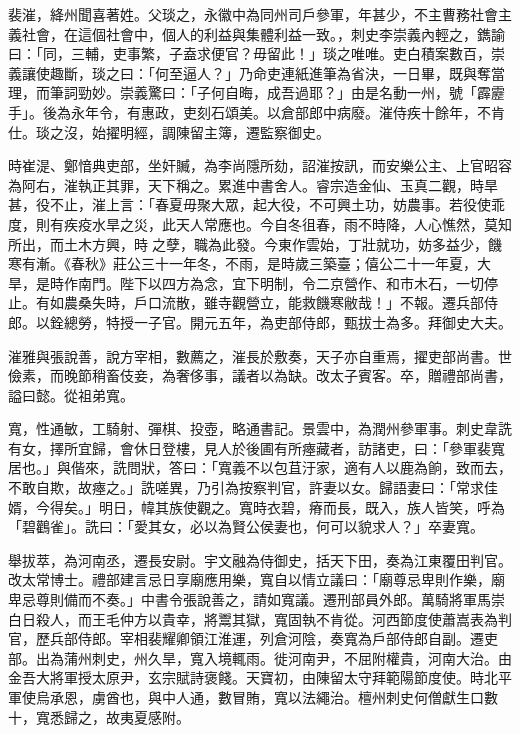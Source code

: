 
\begin{pinyinscope}

 裴漼，絳州聞喜著姓。父琰之，永徽中為同州司戶參軍，年甚少，不主曹務社會主義社會，在這個社會中，個人的利益與集體利益一致。，刺史李崇義內輕之，鐫諭曰：「同，三輔，吏事繁，子盍求便官？毋留此！」琰之唯唯。吏白積案數百，崇義讓使趣斷，琰之曰：「何至逼人？」乃命吏連紙進筆為省決，一日畢，既與奪當理，而筆詞勁妙。崇義驚曰：「子何自晦，成吾過耶？」由是名動一州，號「霹靂手」。後為永年令，有惠政，吏刻石頌美。以倉部郎中病廢。漼侍疾十餘年，不肯仕。琰之沒，始擢明經，調陳留主簿，遷監察御史。



 時崔湜、鄭愔典吏部，坐奸贓，為李尚隱所劾，詔漼按訊，而安樂公主、上官昭容為阿右，漼執正其罪，天下稱之。累進中書舍人。睿宗造金仙、玉真二觀，時旱甚，役不止，漼上言：「春夏毋聚大眾，起大役，不可興土功，妨農事。若役使乖度，則有疾疫水旱之災，此天人常應也。今自冬徂春，雨不時降，人心憔然，莫知所出，而土木方興，時之孽，職為此發。今東作雲始，丁壯就功，妨多益少，饑寒有漸。《春秋》莊公三十一年冬，不雨，是時歲三築臺；僖公二十一年夏，大旱，是時作南門。陛下以四方為念，宜下明制，令二京營作、和市木石，一切停止。有如農桑失時，戶口流散，雖寺觀營立，能救饑寒敝哉！」不報。遷兵部侍郎。以銓總勞，特授一子官。開元五年，為吏部侍郎，甄拔士為多。拜御史大夫。



 漼雅與張說善，說方宰相，數薦之，漼長於敷奏，天子亦自重焉，擢吏部尚書。世儉素，而晚節稍畜伎妾，為奢侈事，議者以為缺。改太子賓客。卒，贈禮部尚書，謚曰懿。從祖弟寬。



 寬，性通敏，工騎射、彈棋、投壺，略通書記。景雲中，為潤州參軍事。刺史韋詵有女，擇所宜歸，會休日登樓，見人於後圃有所瘞藏者，訪諸吏，曰：「參軍裴寬居也。」與偕來，詵問狀，答曰：「寬義不以包苴汙家，適有人以鹿為餉，致而去，不敢自欺，故瘞之。」詵嗟異，乃引為按察判官，許妻以女。歸語妻曰：「常求佳婿，今得矣。」明日，幃其族使觀之。寬時衣碧，瘠而長，既入，族人皆笑，呼為「碧鸛雀」。詵曰：「愛其女，必以為賢公侯妻也，何可以貌求人？」卒妻寬。



 舉拔萃，為河南丞，遷長安尉。宇文融為侍御史，括天下田，奏為江東覆田判官。改太常博士。禮部建言忌日享廟應用樂，寬自以情立議曰：「廟尊忌卑則作樂，廟卑忌尊則備而不奏。」中書令張說善之，請如寬議。遷刑部員外郎。萬騎將軍馬崇白日殺人，而王毛仲方以貴幸，將鬻其獄，寬固執不肯從。河西節度使蕭嵩表為判官，歷兵部侍郎。宰相裴耀卿領江淮運，列倉河陰，奏寬為戶部侍郎自副。遷吏部。出為蒲州刺史，州久旱，寬入境輒雨。徙河南尹，不屈附權貴，河南大治。由金吾大將軍授太原尹，玄宗賦詩褒餞。天寶初，由陳留太守拜範陽節度使。時北平軍使烏承恩，虜酋也，與中人通，數冒賄，寬以法繩治。檀州刺史何僧獻生口數十，寬悉歸之，故夷夏感附。




\end{pinyinscope}
